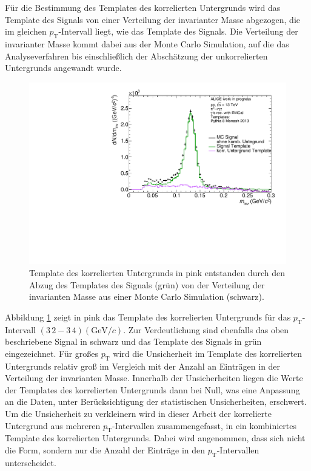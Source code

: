 Für die Bestimmung des Templates des korrelierten Untergrunds wird das Template des Signals von einer Verteilung der invarianter Masse abgezogen, die im gleichen $p_\text{T}$-Intervall liegt, wie das Template des Signals.
Die Verteilung der invarianter Masse kommt dabei aus der Monte Carlo Simulation, auf die das Analyseverfahren bis einschließlich der Abschätzung der unkorrelierten Untergrunds angewandt wurde.
\begin{figure}[tp]
\centering
\includegraphics[width=.75\linewidth]{EntstehungUntergrund10_Data_2016.pdf}
\caption{Template des korrelierten Untergrunds in pink entstanden durch den Abzug des Templates des Signals (grün) von der Verteilung der invarianten Masse aus einer Monte Carlo Simulation (schwarz).}
\label{fig:BkgTemp}
\end{figure}
\newline
Abbildung \ref{fig:BkgTemp} zeigt in pink das Template des korrelierten Untergrunds für das $p_\text{T}$-Intervall $(3\,2 - 3\,4) (\text{GeV/}c)$.
Zur Verdeutlichung sind ebenfalls das oben beschriebene Signal in schwarz und das Template des Signals in grün eingezeichnet.
\newline
Für großes $p_\text{T}$ wird die Unsicherheit im Template des korrelierten Untergrunds relativ groß im Vergleich mit der Anzahl an Einträgen in der Verteilung der invarianten Masse.
Innerhalb der Unsicherheiten liegen die Werte der Templates des korrelierten Untergrunds dann bei Null, was eine Anpassung an die Daten, unter Berücksichtigung der statistischen Unsicherheiten, erschwert.
Um die Unsicherheit zu verkleinern wird in dieser Arbeit der korrelierte Untergrund aus mehreren $p_\text{T}$-Intervallen zusammengefasst, in ein kombiniertes Template des korrelierten Untergrunds.
Dabei wird angenommen, dass sich nicht die Form, sondern nur die Anzahl der Einträge in den $p_\text{T}$-Intervallen unterscheidet.  
